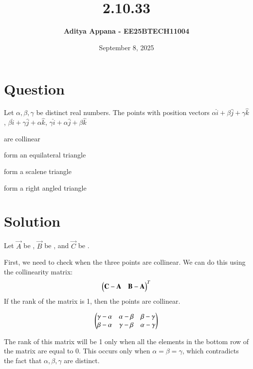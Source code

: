 \documentclass[12pt]{article}
\title{\textbf{2.10.33}}
\author{\textbf{Aditya Appana - EE25BTECH11004 }}
\date{September 8, 2025}
\begin{document}
\maketitle

\section*{Question}

Let $\alpha , \beta, \gamma$ be distinct real numbers. The points with position vectors $\alpha\hat{i} + \beta\hat{j} + \gamma\hat{k}$, $\beta\hat{i} +\gamma\hat{j} + \alpha\hat{k}$, $\gamma\hat{i} + \alpha\hat{j} + \beta\hat{k}$

\begin{enumerate}\begin{multicols}{2}
    \item are collinear
    \item form an equilateral triangle
    \item form a scalene triangle
    \item form a right angled triangle
    \end{multicols}
\end{enumerate}

\section*{Solution}

Let $\vec{A}$ be \myvec{\alpha \\ \beta \\ \gamma}, $\vec{B}$ be \myvec{ \beta \\ \gamma \\ \alpha}, and $\vec{C}$ be \myvec{\gamma \\ \alpha \\ \beta}. 

First, we need to check when the three points are collinear. We can do this using the collinearity matrix: \begin{align}\begin{pmatrix}\mathbf{C}-\mathbf{A} & \mathbf{B} - \mathbf{A}\end{pmatrix}^T\end{align}If the rank of the matrix is 1, then the points are collinear.

\begin{align}
\begin{pmatrix}\gamma - \alpha & \alpha - \beta & \beta - \gamma \\ \beta - \alpha & \gamma - \beta & \alpha - \gamma\end{pmatrix}
\end{align}

The rank of this matrix will be 1 only when all the elements in the bottom row of the matrix are equal to 0. This occurs only when $\alpha = \beta = \gamma$, which contradicts the fact that $\alpha, \beta, \gamma$ are distinct.\\
\end{document}
